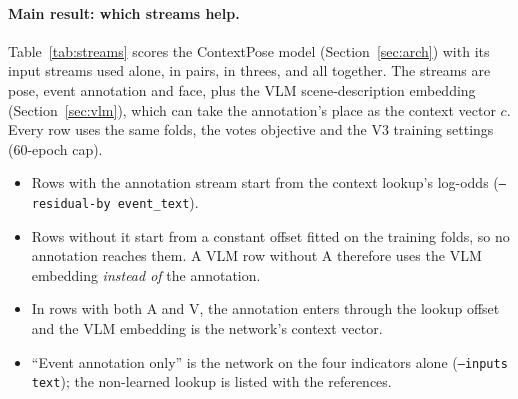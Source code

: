 \documentclass[11pt]{article}
\newcommand{\code}[1]{\texttt{#1}}
\begin{document}
\paragraph{Main result: which streams help.} Table~\ref{tab:streams} scores the ContextPose model (Section~\ref{sec:arch}) with its input streams used alone, in pairs, in threes, and all together. The streams are pose, event annotation and face, plus the VLM scene-description embedding (Section~\ref{sec:vlm}), which can take the annotation's place as the context vector $c$. Every row uses the same folds, the votes objective and the V3 training settings (60-epoch cap).
\begin{itemize}
  \item Rows with the annotation stream start from the context lookup's log-odds (\code{--residual-by event\_text}).
  \item Rows without it start from a constant offset fitted on the training folds, so no annotation reaches them. A VLM row without A therefore uses the VLM embedding \emph{instead of} the annotation.
  \item In rows with both A and V, the annotation enters through the lookup offset and the VLM embedding is the network's context vector.
  \item ``Event annotation only'' is the network on the four indicators alone (\code{--inputs text}); the non-learned lookup is listed with the references.
\end{itemize}
\end{document}
